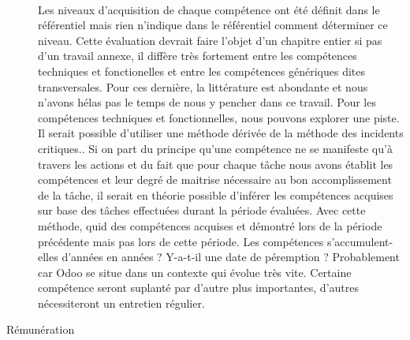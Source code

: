 \begin{description}
\paragraph{}Les niveaux d'acquisition de chaque compétence ont été définit dans le référentiel mais rien n'indique dans le référentiel comment déterminer ce niveau. Cette évaluation devrait faire l'objet d'un chapitre entier si pas d'un travail annexe, il diffère très fortement entre les compétences techniques et fonctionelles et entre les compétences génériques dites transversales. Pour ces dernière, la littérature est abondante et nous n'avons hélas pas le temps de nous y pencher dans ce travail. Pour les compétences techniques et fonctionnelles, nous pouvons explorer une piste. Il serait possible d'utiliser une méthode dérivée de la méthode des incidents critiques.\citep[pp.272]{gestionressourceshumaine2002}. Si on part du principe qu'une compétence ne se manifeste qu'à travers les actions\citep[pp.171]{gestionressourceshumaine2007} et du fait que pour chaque tâche nous avons établit les compétences et leur degré de maitrise nécessaire au bon accomplissement de la tâche, il serait en théorie possible d'inférer les compétences acquises sur base des tâches effectuées durant la période évaluées. Avec cette méthode, quid des compétences acquises et démontré lors de la période précédente mais pas lors de cette période. Les compétences s'accumulent-elles d'années en années ? Y-a-t-il une date de péremption ? Probablement car Odoo se situe dans un contexte qui évolue très vite. Certaine compétence seront suplanté par d'autre plus importantes, d'autres nécessiteront un entretien régulier. 
    \item[Rémunération]

\end{description}
